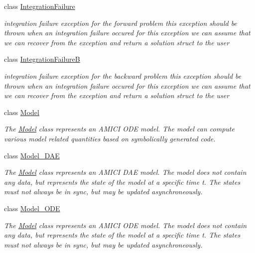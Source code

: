 \begin{DoxyCompactItemize}
class \mbox{\hyperlink{classamici_1_1_integration_failure}{Integration\+Failure}}
\begin{DoxyCompactList}\small\item\em integration failure exception for the forward problem this exception should be thrown when an integration failure occured for this exception we can assume that we can recover from the exception and return a solution struct to the user \end{DoxyCompactList}\item 
class \mbox{\hyperlink{classamici_1_1_integration_failure_b}{Integration\+FailureB}}
\begin{DoxyCompactList}\small\item\em integration failure exception for the backward problem this exception should be thrown when an integration failure occured for this exception we can assume that we can recover from the exception and return a solution struct to the user \end{DoxyCompactList}\item 
class \mbox{\hyperlink{classamici_1_1_model}{Model}}
\begin{DoxyCompactList}\small\item\em The \mbox{\hyperlink{classamici_1_1_model}{Model}} class represents an A\+M\+I\+CI O\+DE model. The model can compute various model related quantities based on symbolically generated code. \end{DoxyCompactList}\item 
class \mbox{\hyperlink{classamici_1_1_model___d_a_e}{Model\+\_\+\+D\+AE}}
\begin{DoxyCompactList}\small\item\em The \mbox{\hyperlink{classamici_1_1_model}{Model}} class represents an A\+M\+I\+CI D\+AE model. The model does not contain any data, but represents the state of the model at a specific time t. The states must not always be in sync, but may be updated asynchroneously. \end{DoxyCompactList}\item 
class \mbox{\hyperlink{classamici_1_1_model___o_d_e}{Model\+\_\+\+O\+DE}}
\begin{DoxyCompactList}\small\item\em The \mbox{\hyperlink{classamici_1_1_model}{Model}} class represents an A\+M\+I\+CI O\+DE model. The model does not contain any data, but represents the state of the model at a specific time t. The states must not always be in sync, but may be updated asynchroneously. \end{DoxyCompactList}\item 

\end{DoxyCompactItemize}
